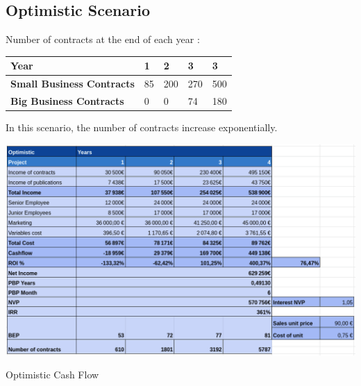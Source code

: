 \documentclass[./main.tex]{subfiles}
\begin{document}
\subsection{Optimistic Scenario}
Number of contracts at the end of each year : 
\begin{table}[H]
	\centering
\begin{tabular}{|l|l|l|l|l|}
\hline
\textbf{Year}                     & 1  & 2   & 3   & 3   \\ \hline
\textbf{Small Business Contracts} & 85 & 200 & 270 & 500 \\ \hline
\textbf{Big Business Contracts}   & 0  & 0   & 74  & 180 \\ \hline
\end{tabular}
\end{table}
In this scenario, the number of contracts increase exponentially.
\begin{table}[H]
	\centering
	\includegraphics[width=14cm]{img/optimistic.png}
	\caption{Optimistic Cash Flow}
	\label{tab:optimistic}
\end{table}
\end{document}
